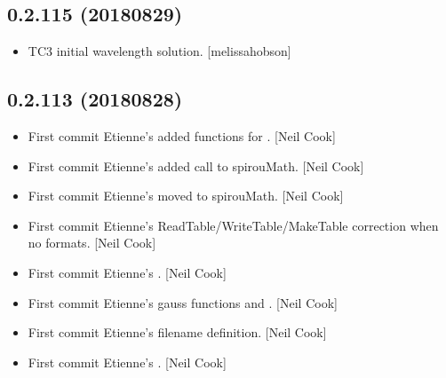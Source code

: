\documentclass[a4paper,10pt,english]{report}
\begin{document}
\subsection{0.2.115 (2018\sphinxhyphen{}08\sphinxhyphen{}29)}
\label{\detokenize{misc/changelog:id365}}\begin{itemize}
\item {} 
TC3 initial wavelength solution. {[}melissa\sphinxhyphen{}hobson{]}

\end{itemize}


\subsection{0.2.113 (2018\sphinxhyphen{}08\sphinxhyphen{}28)}
\label{\detokenize{misc/changelog:id366}}\begin{itemize}
\item {} 
First commit \sphinxhyphen{} Etienne’s  \sphinxhyphen{} added functions for . {[}Neil
Cook{]}

\item {} 
First commit \sphinxhyphen{} Etienne’s  \sphinxhyphen{} added call to spirouMath. {[}Neil
Cook{]}

\item {} 
First commit \sphinxhyphen{} Etienne’s  \sphinxhyphen{} moved  to spirouMath. {[}Neil
Cook{]}

\item {} 
First commit \sphinxhyphen{} Etienne’s  \sphinxhyphen{} ReadTable/WriteTable/MakeTable
correction when no formats. {[}Neil Cook{]}

\item {} 
First commit \sphinxhyphen{} Etienne’s  \sphinxhyphen{} . {[}Neil Cook{]}

\item {} 
First commit \sphinxhyphen{} Etienne’s  \sphinxhyphen{} gauss functions and . {[}Neil
Cook{]}

\item {} 
First commit \sphinxhyphen{} Etienne’s  \sphinxhyphen{} filename definition. {[}Neil Cook{]}

\item {} 
First commit \sphinxhyphen{} Etienne’s . {[}Neil Cook{]}


\end{itemize}
\end{document}
